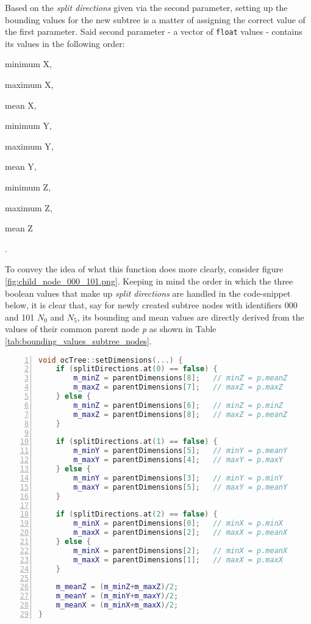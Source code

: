 Based on the \textit{split directions} given via the second parameter, setting up the bounding values for the new subtree is a matter of assigning the correct value of the first parameter. Said second parameter - a vector of \texttt{float} values - contains its values in the following order:
\begin{enumerate*}
\addtocounter{enumi}{-1}
	\item minimum X,
	\item maximum X,
	\item mean X,
	\item minimum Y,
	\item maximum Y,
	\item mean Y,
	\item minimum Z,
	\item maximum Z,
	\item mean Z
\end{enumerate*}.

To convey the idea of what this function does more clearly, consider figure \ref{fig:child_node_000_101.png}. Keeping in mind the order in which the three boolean values that make up \textit{split directions} are handled in the code-snippet below, it is clear that, say for newly created subtree nodes with identifiers 000 and 101 \textit{$N_0$} and \textit{$N_5$}, its bounding and mean values are directly derived from the values of their common parent node \textit{p} as shown in Table \ref{tab:bounding_values_subtree_nodes}.

\begin{minipage}{\linewidth}
\begin{lstlisting}[language=C++,numberstyle=\zebra{black!5}{white}{},numbers=left,xleftmargin=2em,tabsize=3]
void ocTree::setDimensions(...) {
	if (splitDirections.at(0) == false) {
		m_minZ = parentDimensions[8];	// minZ = p.meanZ
		m_maxZ = parentDimensions[7];	// maxZ = p.maxZ
	} else {
		m_minZ = parentDimensions[6];	// minZ = p.minZ
		m_maxZ = parentDimensions[8];	// maxZ = p.meanZ
	}

	if (splitDirections.at(1) == false) {
		m_minY = parentDimensions[5];	// minY = p.meanY
		m_maxY = parentDimensions[4];	// maxY = p.maxY
	} else {
		m_minY = parentDimensions[3];	// minY = p.minY
		m_maxY = parentDimensions[5];	// maxY = p.meanY
	}

	if (splitDirections.at(2) == false) {
		m_minX = parentDimensions[0];	// minX = p.minX
		m_maxX = parentDimensions[2];	// maxX = p.meanX
	} else {
		m_minX = parentDimensions[2];	// minX = p.meanX
		m_maxX = parentDimensions[1];	// maxX = p.maxX
	}

	m_meanZ = (m_minZ+m_maxZ)/2;
	m_meanY = (m_minY+m_maxY)/2;
	m_meanX = (m_minX+m_maxX)/2;
}
\end{lstlisting}
\end{minipage}

